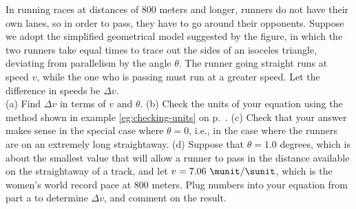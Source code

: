 In running races at distances of 800 meters and longer,
runners do not have their own lanes, so in order to pass,
they have to go around their opponents. Suppose we adopt
the simplified geometrical model suggested by the figure,
in which the two runners take equal times to trace out the 
sides of an isoceles triangle, deviating from parallelism by the
angle $\theta$. The runner going straight runs at speed $v$,
while the one who is passing must run at a greater speed. Let
the difference in speeds be $\Delta v$.\\
(a) Find $\Delta v$ in terms of $v$ and $\theta$.\answercheck\hwendpart
(b) Check the units of your equation using the method shown in example \ref{eg:checking-units}
on p.~\pageref{eg:checking-units}.\hwendpart
(c) Check that your answer makes sense in the special case where $\theta=0$, i.e.,
in the case where the runners are on an extremely long straightaway.\hwendpart
(d) Suppose that $\theta=1.0$ degrees, which is about the smallest value
that will allow a runner to pass in the distance available on the straightaway
of a track, and let $v=7.06\ \munit/\sunit$, which is the women's world record pace
at 800 meters.
Plug numbers into your equation from part a to determine $\Delta v$, and
comment on the result.\answercheck\hwendpart
